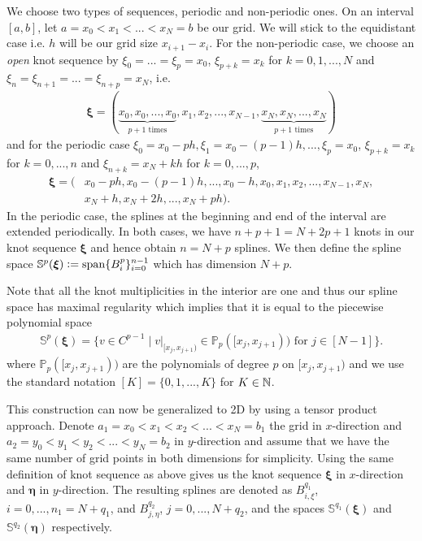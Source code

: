 \documentclass[../master_thesis.tex]{subfiles}
\begin{document}
We choose two types of sequences, periodic and non-periodic ones.
On an interval $[a,b]$, 
let $a= x_0 < x_1 < ... < x_N = b$ be our grid. 
We will stick to the equidistant case i.e. $h$ will be our grid size 
$x_{i+1} - x_i$.
For the non-periodic case, we choose an \textit{open} knot sequence by 
$\xi_0 = ... = \xi_p = x_0$, $\xi_{p+k} = x_k$ for $k = 0,1,...,N$ and 
$\xi_{n} = \xi_{n+1} = ... = \xi_{n+p} = x_N$, i.e. 
\begin{align*}
    \bm{\xi} = (\underbrace{x_0, x_0,...,x_0}_{\text{$p+1$ times}}, x_1, x_2, ..., x_{N-1}, 
        \underbrace{x_N, x_N, ..., x_N}_{\text{$p+1$ times}})   
\end{align*}
and for the periodic case 
$\xi_0 = x_0-ph, \xi_1 = x_0-(p-1)h, ..., \xi_p = x_0$, 
$\xi_{p+k} = x_k$ for $k=0,..., n$ and $\xi_{n+k} = x_N + kh$ for $k = 0, ..., p$, 
\begin{align*}
    \bm{\xi} = (&x_0-ph,x_0-(p-1)h,...,x_0-h, x_0,  x_1, x_2, ..., x_{N-1}, 
        x_N, 
    \\ &x_N + h, x_N + 2h, ..., x_N + ph ).
\end{align*}
In the periodic case, the splines at the beginning and end of the interval are extended periodically.
In both cases, we have $n + p +1 = N+2p+1$ knots in our knot sequence $\bm{\xi}$ and
hence obtain $n = N + p$ splines.
We then define the spline space $\mathbb{S}^p(\bm{\xi}) \vcentcolon= \operatorname{span} \{ B_i^p \}_{i=0}^{n-1}$
which has dimension $N+p$.

Note that all the knot multiplicities in the interior are one and thus our spline 
space has maximal regularity which implies that it is equal to the piecewise polynomial space
\begin{align*}
    \mathbb{S}^p(\bm{\xi}) = \{ v \in C^{p-1} \mid v |_{[x_j,x_{j+1})} \in \mathbb{P}_p([x_j,x_{j+1})) 
        \text{ for } j\in [N-1]\}.
\end{align*}
where $\mathbb{P}_p([x_j,x_{j+1}))$ are the polynomials of degree $p$ on $[x_j,x_{j+1})$ 
and we use the standard notation $[K] = \{ 0, 1, ..., K\}$ for $K\in \mathbb{N}$.

This construction can now be generalized to 2D by using a tensor product approach.
Denote $a_1 = x_0 < x_1 < x_2 < ... < x_N = b_1$ the grid in $x$-direction and 
$a_2 = y_0 < y_1 < y_2 < ... < y_N = b_2$ in $y$-direction and assume that we have the 
same number of grid points in both dimensions for simplicity. 
Using the same definition of knot sequence as above gives us the knot sequence 
$\bm{\xi}$ in $x$-direction and $\bm{\eta}$ in $y$-direction. The resulting splines 
are denoted as $B_{i,\xi}^{q_1}$, $i=0,...,n_1 = N + q_1$, and $B_{j,\eta}^{q_2}$, 
$j = 0,...,N + q_2$, and the spaces
$\mathbb{S}^{q_1}(\bm{\xi})$ and $\mathbb{S}^{q_2}(\bm{\eta})$ respectively.
\end{document}
